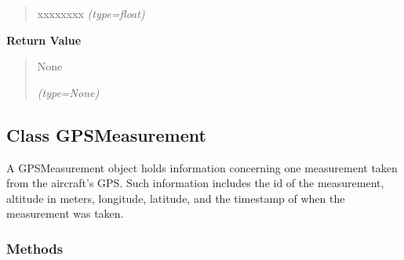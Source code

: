 \begin{boxedminipage}{\funcwidth}
\begin{quote}
\begin{Ventry}{xxxxxxxx}
            {\it (type=float)}

        \end{Ventry}

      \end{quote}

      \textbf{Return Value}
    \vspace{-1ex}

      \begin{quote}
      None

      {\it (type=None)}

      \end{quote}

    \end{boxedminipage}



\subsection{Class GPSMeasurement}

    \label{client_rest:GPSMeasurement}
A GPSMeasurement object holds information concerning one measurement taken 
from the aircraft's GPS. Such information includes the id of the 
measurement, altitude in meters, longitude, latitude, and the timestamp of 
when the measurement was taken.



  \subsubsection{Methods}

    \label{client_rest:GPSMeasurement:__init__}

    \vspace{0.5ex}

